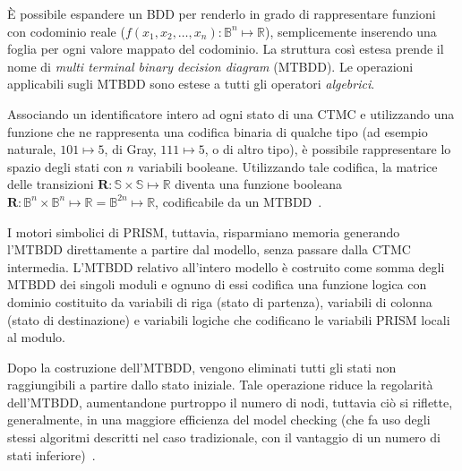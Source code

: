 	\`E possibile espandere un BDD per renderlo in grado di rappresentare funzioni con codominio reale ($f(x_1, x_2, \dots, x_n): \mathbb{B}^n \mapsto \mathbb{R}$), semplicemente inserendo una foglia per ogni valore mappato del codominio. La struttura cos\`i estesa prende il nome di \emph{multi terminal binary decision diagram} (MTBDD).
	Le operazioni applicabili sugli MTBDD sono estese a tutti gli operatori \emph{algebrici}.
	
	Associando un identificatore intero ad ogni stato di una CTMC e utilizzando una funzione che ne rappresenta una codifica binaria di qualche tipo (ad esempio naturale, $101 \mapsto 5$, di Gray, $111 \mapsto 5$, o di altro tipo), \`e possibile rappresentare lo spazio degli stati con $n$ variabili booleane.
	Utilizzando tale codifica, la matrice delle transizioni $\mathbf{R} : \mathbb{S} \times \mathbb{S} \mapsto \mathbb{R}$ diventa una funzione booleana $\mathbf{R} : \mathbb{B}^n \times \mathbb{B}^n \mapsto \mathbb{R} = \mathbb{B}^{2n} \mapsto \mathbb{R}$, codificabile da un MTBDD~\cite{mtbdd}.

	I motori simbolici di PRISM, tuttavia, risparmiano memoria generando l'MTBDD direttamente a partire dal modello, senza passare dalla CTMC intermedia.
	L'MTBDD relativo all'intero modello \`e costruito come somma degli MTBDD dei singoli moduli e ognuno di essi codifica una funzione logica con dominio costituito da variabili di riga (stato di partenza), variabili di colonna (stato di destinazione) e variabili logiche che codificano le variabili PRISM locali al modulo.
	
	Dopo la costruzione dell'MTBDD, vengono eliminati tutti gli stati non raggiungibili a partire dallo stato iniziale.
	Tale operazione riduce la regolarit\`a dell'MTBDD, aumentandone purtroppo il numero di nodi, tuttavia ci\`o si riflette, generalmente, in una maggiore efficienza del model checking (che fa uso degli stessi algoritmi descritti nel caso tradizionale, con il vantaggio di un numero di stati inferiore)~\cite{parker2003implementation}.